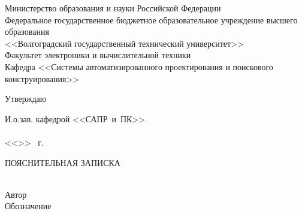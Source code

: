 \begin{titlepage}
    \begin{center}
        Министерство образования и науки Российской Федерации \\
        \vspace{.5cm}
        Федеральное государственное бюджетное образовательное учреждение высшего образования\\
        <<Волгоградский государственный технический университет>>\\
        Факультет электроники и вычислительной техники\\
        \vspace{.5cm}
        Кафедра <<Системы автоматизированного проектирования и поискового конструирования>>
        \vspace{.5cm}
    \end{center}
    \begin{flushright}
        \begin{center}
            \hspace*{10.5em}Утверждаю
        \end{center}
        И.о.зав. кафедрой <<САПР~и~ПК>>\\
        \quad{}\\
        <<\underline{\hspace{2em}}>> \underline{\hspace{7.5em}} \the\year\ г.
    \end{flushright}
    \begin{center}
        \large ПОЯСНИТЕЛЬНАЯ ЗАПИСКА\\
            {}\\
        \vspace{10pt}\underline{\hspace{\textwidth}}
        \underline{\hspace{\textwidth}}
    \end{center}
    Автор  \quad 
    \\
    Обозначение 

\end{titlepage}
